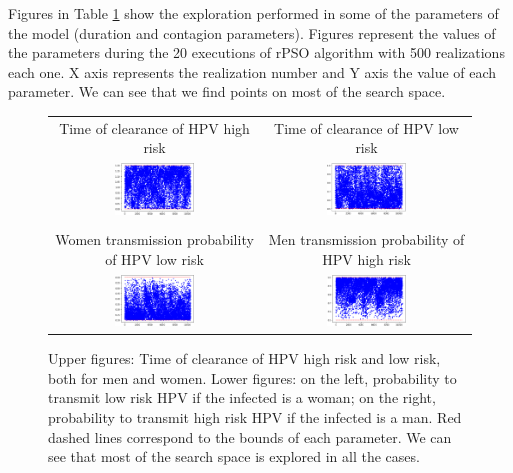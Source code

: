 Figures in Table \ref{Ctg} show the exploration performed in some of the parameters of the model (duration and contagion parameters). Figures represent the values of the parameters during the 20 executions of rPSO algorithm with 500 realizations each one. X axis represents the realization number and Y axis the value of each parameter. We can see that we find points on most of the search space.

\begin{figure}[!h]
\begin{center}	
\begin{tabular}{cc}
	Time of clearance of HPV high risk & Time of clearance of HPV low risk \\
	\includegraphics[width=0.4\textwidth]{IMGs/1.-Calibrado/Dura_HR_H.png} & \includegraphics[width=0.4\textwidth]{IMGs/1.-Calibrado/Dura_LR_H.png} \\ 
	\\
	Women transmission probability of HPV low risk & Men transmission probability of HPV high risk \\
	\includegraphics[width=0.4\textwidth]{IMGs/1.-Calibrado/Ctg_M_LR.png} & \includegraphics[width=0.4\textwidth]{IMGs/1.-Calibrado/Ctg_H_HR.png}  
\end{tabular}
\caption{Upper figures: Time of clearance of HPV high risk and low risk, both for men and women. Lower figures: on the left, probability to transmit low risk HPV if the infected is a woman; on the right, probability to transmit high risk HPV if the infected is a man. Red dashed lines correspond to the bounds of each parameter. We can see that most of the search space is explored in all the cases.} 
\label{Ctg}
\end{center}
\end{figure}

